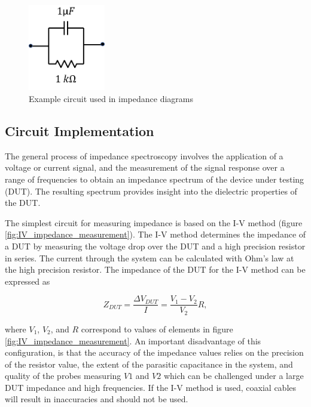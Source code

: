 \begin{figure}[t]
    \centering
    \includegraphics[width=0.3\textwidth]{images/exampleCircuit.png}
    \caption{Example circuit used in impedance diagrams}
    \label{fig:example_circuit}
\end{figure} 
\newpage 

 \subsection*{Circuit Implementation}
 \par The general process of impedance spectroscopy involves the application of a voltage or current signal, and the measurement of the signal response over a range of frequencies to obtain an impedance spectrum of the device under testing (DUT). The resulting spectrum provides insight into the dielectric properties of the DUT. 
 
 \par The simplest circuit for measuring impedance is based on the I-V method (figure \ref{fig:IV_impedance_measurement}). The I-V method determines the impedance of a DUT by measuring the voltage drop over the DUT and a high precision resistor in series. The current through the system can be calculated with Ohm's law at the high precision resistor. The impedance of the DUT for the I-V method can be expressed as 
 
 \begin{equation}
     Z_{DUT} = \frac{\Delta V_{DUT}}{I} = \frac{V_1 - V_2}{V_2}R,
     \label{eqn:IV_Z}
 \end{equation}
 
 \noindent where $V_1$, $V_2$, and $R$ correspond to values of elements in figure \ref{fig:IV_impedance_measurement}. An important disadvantage of this configuration, is that the accuracy of the impedance values relies on the precision of the resistor value, the extent of the parasitic capacitance in the system, and quality of the probes measuring $V1$ and $V2$ which can be challenged under a large DUT impedance and high frequencies. If the I-V method is used, coaxial cables will result in inaccuracies and should not be used.
 
